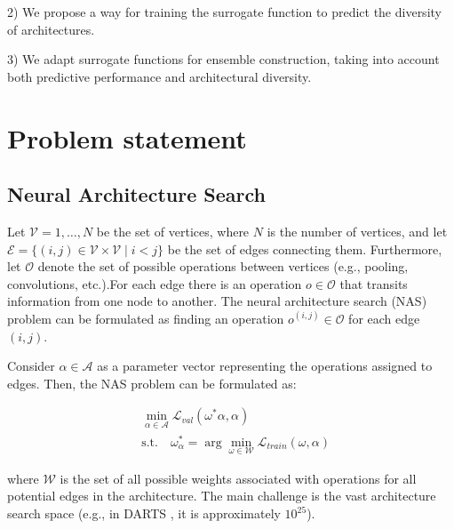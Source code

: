 \documentclass[USenglish]{article}
\theoremstyle{dgthm}
\begin{document}
2) We propose a way for training the surrogate function to predict the diversity of architectures.

3) We adapt surrogate functions for ensemble construction, taking into account both predictive performance and architectural diversity.


\section{Problem statement}

\subsection{Neural Architecture Search}

Let $\mathcal{V} = {1, \dots, N}$ be the set of vertices, where $N$ is the number of vertices, and let $\mathcal{E} = \{(i, j) \in \mathcal{V} \times \mathcal{V} \mid i < j \}$ be the set of edges connecting them. Furthermore, let $\mathcal{O}$ denote the set of possible operations between vertices (e.g., pooling, convolutions, etc.).For
each edge there is an operation $o \in \mathcal{O}$  that transits information from one node
to another. The neural architecture search (NAS) problem can be formulated as finding an operation $o^{(i, j)} \in \mathcal{O}$ for each edge $(i, j)$.

Consider $\alpha \in \mathcal{A}$ as a parameter vector representing the operations assigned to edges. Then, the NAS problem can be formulated as:

\begin{equation} \begin{aligned} & \min_{\alpha \in \mathcal{A}} \mathcal{L}_{val}(\omega^*{\alpha}, \alpha) \\ & \text{s.t.} \quad \omega^*_{\alpha} = \arg \min_{\omega \in \mathcal{W}} \mathcal{L}_{train}(\omega, \alpha) \end{aligned} \label{eq:nas_problem} \end{equation}

where $\mathcal{W}$ is the set of all possible weights associated with operations for all potential edges in the architecture. The main challenge is the vast architecture search space (e.g., in DARTS \cite{Liu2018}, it is approximately $10^{25}$).





\end{document}
